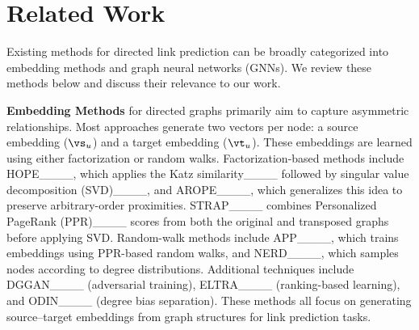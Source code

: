 \section{Related Work}
\label{app:related_work}
Existing methods for directed link prediction can be broadly categorized into embedding methods and graph neural networks (GNNs). We review these methods below and discuss their relevance to our work.

\textbf{Embedding Methods} for directed graphs primarily aim to capture asymmetric relationships. Most approaches generate two vectors per node: a source embedding ($\vs_u$) and a target embedding ($\vt_u$). These embeddings are learned using either factorization or random walks. Factorization-based methods include HOPE____, which applies the Katz similarity____ followed by singular value decomposition (SVD)____, and AROPE____, which generalizes this idea to preserve arbitrary-order proximities. STRAP____ combines Personalized PageRank (PPR)____ scores from both the original and transposed graphs before applying SVD. Random-walk methods include APP____, which trains embeddings using PPR-based random walks, and NERD____, which samples nodes according to degree distributions. Additional techniques include DGGAN____ (adversarial training), ELTRA____ (ranking-based learning), and ODIN____ (degree bias separation). These methods all focus on generating source–target embeddings from graph structures for link prediction tasks.


